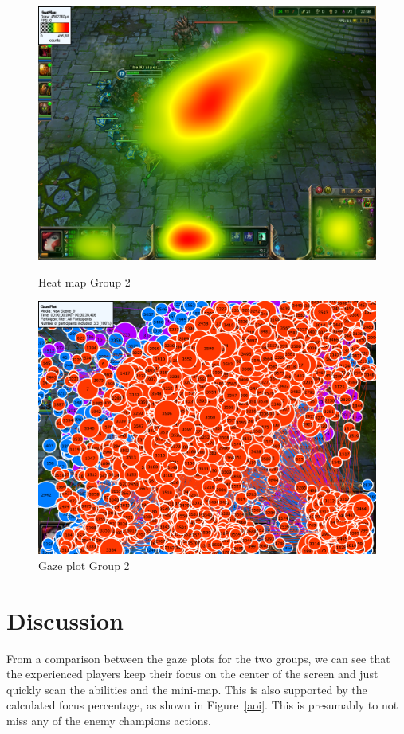 \documentclass[notitlepage]{report}
\begin{document}
\begin{figure}[!ht]
\begin{minipage}[b]{0.45\linewidth}
\centering
\includegraphics[width=\textwidth]{images/heatmap/Pros}
\caption{Heat map Group 2}
\label{heat_pro}
\end{minipage}
\hspace{0.5cm}
\begin{minipage}[b]{0.45\linewidth}
\centering
\includegraphics[width=\textwidth]{images/gazeplot/Pros}
\caption{Gaze plot Group 2}
\label{gaze_pro}
\end{minipage}
\end{figure}

\section{Discussion}
From a comparison between the gaze plots for the two groups, we can see that the experienced players keep their focus on the center of the screen and just quickly scan the abilities and the mini-map. This is also supported by the calculated focus percentage, as shown in Figure~\ref{aoi}. This is presumably to not miss any of the enemy champions actions.
\end{document}
